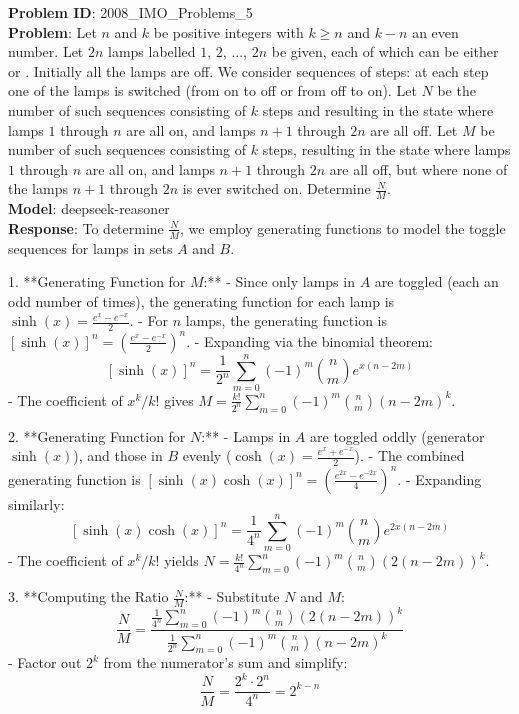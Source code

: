 \textbf{Problem ID}: 2008_IMO_Problems_5 \\
    \textbf{Problem}: Let $n$ and $k$ be positive integers with $k \geq n$ and $k - n$ an even number. Let $2n$ lamps labelled $1$, $2$, ..., $2n$ be given, each of which can be either  or . Initially all the lamps are off. We consider sequences of steps: at each step one of the lamps is switched (from on to off or from off to on).
Let $N$ be the number of such sequences consisting of $k$ steps and resulting in the state where lamps $1$ through $n$ are all on, and lamps $n + 1$ through $2n$ are all off.
Let $M$ be number of such sequences consisting of $k$ steps, resulting in the state where lamps $1$ through $n$ are all on, and lamps $n + 1$ through $2n$ are all off, but where none of the lamps $n + 1$ through $2n$ is ever switched on.
Determine $\frac {N}{M}$. \\
    \textbf{Model}: deepseek-reasoner \\
    \textbf{Response}: To determine \(\frac{N}{M}\), we employ generating functions to model the toggle sequences for lamps in sets \(A\) and \(B\).

1. **Generating Function for \(M\):**
   - Since only lamps in \(A\) are toggled (each an odd number of times), the generating function for each lamp is \(\sinh(x) = \frac{e^x - e^{-x}}{2}\).
   - For \(n\) lamps, the generating function is \([\sinh(x)]^n = \left(\frac{e^x - e^{-x}}{2}\right)^n\).
   - Expanding via the binomial theorem:
     \[
     [\sinh(x)]^n = \frac{1}{2^n} \sum_{m=0}^n (-1)^m \binom{n}{m} e^{x(n-2m)}
     \]
   - The coefficient of \(x^k/k!\) gives \(M = \frac{k!}{2^n} \sum_{m=0}^n (-1)^m \binom{n}{m} (n-2m)^k\).

2. **Generating Function for \(N\):**
   - Lamps in \(A\) are toggled oddly (generator \(\sinh(x)\)), and those in \(B\) evenly (\(\cosh(x) = \frac{e^x + e^{-x}}{2}\)).
   - The combined generating function is \([\sinh(x)\cosh(x)]^n = \left(\frac{e^{2x} - e^{-2x}}{4}\right)^n\).
   - Expanding similarly:
     \[
     [\sinh(x)\cosh(x)]^n = \frac{1}{4^n} \sum_{m=0}^n (-1)^m \binom{n}{m} e^{2x(n-2m)}
     \]
   - The coefficient of \(x^k/k!\) yields \(N = \frac{k!}{4^n} \sum_{m=0}^n (-1)^m \binom{n}{m} (2(n-2m))^k\).

3. **Computing the Ratio \(\frac{N}{M}\):**
   - Substitute \(N\) and \(M\):
     \[
     \frac{N}{M} = \frac{\frac{1}{4^n} \sum_{m=0}^n (-1)^m \binom{n}{m} (2(n-2m))^k}{\frac{1}{2^n} \sum_{m=0}^n (-1)^m \binom{n}{m} (n-2m)^k}
     \]
   - Factor out \(2^k\) from the numerator's sum and simplify:
     \[
     \frac{N}{M} = \frac{2^k \cdot 2^n}{4^n} = 2^{k - n}
     \]
   
